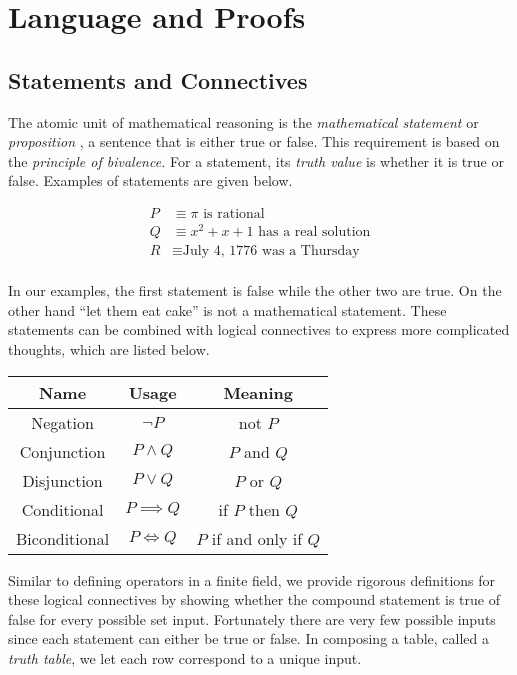 \documentclass{report}
\begin{document}
\chapter{Language and Proofs}
\section{Statements and Connectives}
The atomic unit of mathematical reasoning is the \emph{mathematical statement} or \emph{proposition} , a sentence that is either true or false. This requirement is based on the \emph{principle of bivalence.} For a statement, its \emph{truth value} is whether it is true or false. Examples of statements are given below.

\begin{align*}
	P &\equiv \text{$\pi$ is rational} \\
	Q &\equiv \text{$x^2 + x + 1$ has a real solution} \\
	R &\equiv \text{July 4, 1776 was a Thursday} \\
\end{align*}
 
In our examples, the first statement is false while the other two are true. On the other hand ``let them eat cake'' is not a mathematical statement. These statements can be combined with logical connectives to express more complicated thoughts, which are listed below.

\vspace{\baselineskip}
\begin{center}
	\begin{tabular}{ccc}
		\toprule
		Name & Usage & Meaning \\
		\midrule
		Negation & $\neg P$ & not $P$ \\
		Conjunction & $P \wedge Q$ & $P$ and $Q$ \\
		Disjunction & $P \lor Q$ & $P$ or $Q$ \\
		Conditional & $P \implies Q$ & if $P$ then $Q$ \\
		Biconditional & $P \iff Q$ & $P$ if and only if $Q$ \\
		\bottomrule
	\end{tabular}
\end{center} 
\vspace{\baselineskip}

Similar to defining operators in a finite field, we provide rigorous definitions for these logical connectives by showing whether the compound statement is true of false for every possible set input. Fortunately there are very few possible inputs since each statement can either be true or false. In composing a table, called a \emph{truth table},  we let each row correspond to a unique input.
\end{document}
